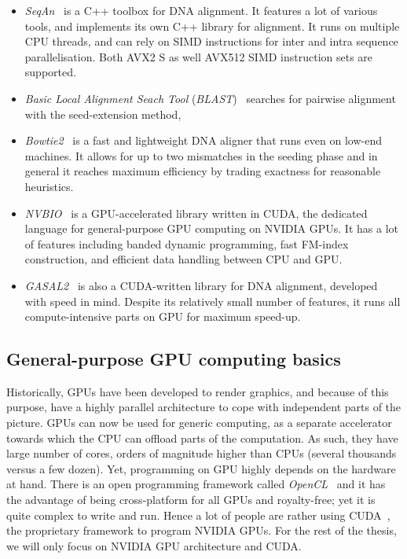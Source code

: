 \begin{itemize}
    \item \emph{SeqAn}~\cite{Doring:seqan} is a C++ toolbox for DNA alignment. It features a lot of various tools, and implements its own C++ library for alignment. It runs on multiple CPU threads, and can rely on SIMD instructions for inter and intra sequence parallelisation. Both AVX2 S as well AVX512 SIMD instruction sets are supported.
    \item \emph{Basic Local Alignment Seach Tool} (\emph{BLAST})~\cite{Altschul:BLAST} searches for pairwise alignment with the seed-extension method,
    \item \emph{Bowtie2}~\cite{Langmead:bowtie} is a fast and lightweight DNA aligner that runs even on low-end machines. It allows for up to two mismatches in the seeding phase and in general it reaches maximum efficiency by trading exactness for reasonable heuristics.
    \item \emph{NVBIO}~\cite{nvidia:nvbio} is a GPU-accelerated library written in CUDA, the dedicated language for general-purpose GPU computing on NVIDIA GPUs. It has a lot of features including banded dynamic programming, fast FM-index construction, and efficient data handling between CPU and GPU.
    \item \emph{GASAL2}~\cite{Ahmed:gasal2} is also a CUDA-written library for DNA alignment, developed with speed in mind. Despite its relatively small number of features, it runs all compute-intensive parts on GPU for maximum speed-up.
\end{itemize}


\subsection{General-purpose GPU computing basics}

Historically, GPUs have been developed to render graphics, and because of this purpose, have a highly parallel architecture to cope with independent parts of the picture. GPUs can now be used for generic computing, as a separate accelerator towards which the CPU can offload parts of the computation. As such, they have large number of cores, orders of magnitude higher than CPUs (several thousands versus a few dozen). Yet, programming on GPU highly depends on the hardware at hand. There is an open programming framework called \emph{OpenCL}~\cite{misc:opencl} and it has the advantage of being cross-platform for all GPUs and royalty-free; yet it is quite complex to write and run. Hence a lot of people are rather using CUDA~\cite{misc:cuda}, the proprietary framework to program NVIDIA GPUs. For the rest of the thesis, we will only focus on NVIDIA GPU architecture and CUDA.

